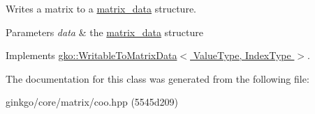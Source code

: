 Writes a matrix to a \hyperlink{structgko_1_1matrix__data}{matrix\+\_\+data} structure. 


\begin{DoxyParams}{Parameters}
{\em data} & the \hyperlink{structgko_1_1matrix__data}{matrix\+\_\+data} structure \\
\hline
\end{DoxyParams}


Implements \hyperlink{classgko_1_1WritableToMatrixData_a96036c3a4bf4c67fa93002808b8b14e2}{gko\+::\+Writable\+To\+Matrix\+Data$<$ Value\+Type, Index\+Type $>$}.



The documentation for this class was generated from the following file\+:\begin{DoxyCompactItemize}
\item 
ginkgo/core/matrix/coo.\+hpp (5545d209)\end{DoxyCompactItemize}
